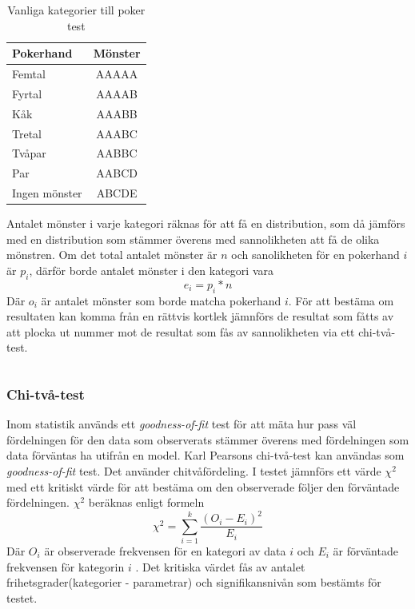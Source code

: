\documentclass[swedish,a4paper]{article}
\begin{document}
\begin{table}[H] 
	\centering
        \caption{Vanliga kategorier till poker test}
        \label{tab:num_poker_hands}
	\begin{tabular}{|l|c|}
	\hline 
	Pokerhand & Mönster \\ \hline  
	Femtal & AAAAA \\ \hline
	Fyrtal & AAAAB \\ \hline
	Kåk & AAABB \\ \hline
	Tretal & AAABC \\ \hline
	Tvåpar & AABBC \\ \hline
	Par & AABCD \\ \hline
    	Ingen mönster & ABCDE \\ \hline
	
\end{tabular}

\end{table}

 Antalet mönster i varje kategori räknas för att få en distribution, som
 då jämförs med en distribution som stämmer överens med sannolikheten
 att få de olika mönstren. Om det total antalet mönster är $n$ och
 sanolikheten för en pokerhand $i$ är $p_i$, därför borde antalet mönster i
 den kategori vara $$e_i = p_i * n$$ Där $o_i$ är antalet mönster som
 borde matcha pokerhand $i$. För att bestäma om resultaten kan komma
 från en rättvis kortlek jämnförs de resultat som fåtts av att plocka
 ut nummer mot de resultat som fås av sannolikheten via ett chi-två-test.

\begin{equation*}
\end{equation*}

\subsubsection{Chi-två-test}
\label{sec:chi_square}
Inom statistik används ett \textit{goodness-of-fit} test för att mäta
hur pass väl fördelningen för den data som observerats stämmer överens
med fördelningen som data förväntas ha utifrån en model. Karl Pearsons
chi-två-test kan användas som \textit{goodness-of-fit} test. Det
använder chitvåfördeling. I testet jämnförs ett värde $\chi^2$ med ett
kritiskt värde för att bestäma om den observerade följer den förväntade
fördelningen. $\chi^2$ beräknas enligt formeln
$$\chi^2 = \sum_{i=1}^k\frac{(O_i - E_i)^2}{E_i}$$
Där $O_i$ är observerade frekvensen för en kategori av data $i$ och $E_i$
är förväntade frekvensen för kategorin $i$ \parencite{nist}.
Det kritiska värdet fås av antalet frihetsgrader(kategorier - parametrar)
och signifikansnivån som bestämts för testet.
\end{document}
